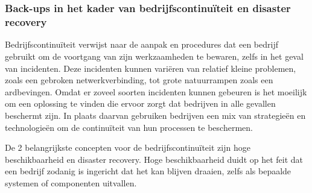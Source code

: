 \chapter{}%
\label{ch:stand-van-zaken}






\subsection{Back-ups in het kader van bedrijfscontinuïteit en disaster recovery}
Bedrijfscontinuïteit verwijst naar de aanpak en procedures dat een bedrijf gebruikt om de voortgang van zijn werkzaamheden te bewaren, zelfs in het geval van incidenten. Deze incidenten kunnen variëren van relatief kleine problemen, zoals een gebroken netwerkverbinding, tot grote natuurrampen zoals een ardbevingen. Omdat er zoveel soorten incidenten kunnen gebeuren is het moeilijk om een oplossing te vinden die ervoor zorgt dat bedrijven in alle gevallen beschermt zijn. In plaats daarvan gebruiken bedrijven een mix van strategieën en technologieën om de continuïteit van hun processen te beschermen. 

De 2 belangrijkste concepten voor de bedrijfscontinuïteit zijn hoge beschikbaarheid en disaster recovery. Hoge beschikbaarheid duidt op het feit dat een bedrijf zodanig is ingericht dat het kan blijven draaien, zelfs als bepaalde systemen of componenten uitvallen. 

